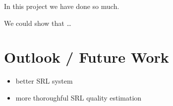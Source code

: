 \label{chap:6_conclusion}
In this project we have done so much.

We could show that \ldots \\

\section{Outlook / Future Work}


\begin{itemize}
  \item better SRL system
  \item more thoroughful SRL quality estimation
\end{itemize}


